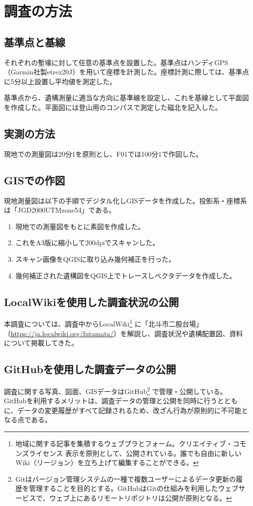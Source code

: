 \documentclass[14Q]{jsarticle}
\begin{document}
\section{調査の方法}
\subsection{基準点と基線}
それぞれの塹壕に対して任意の基準点を設置した。基準点はハンディGPS（Garmin社製etrex20J）を用いて座標を計測した。座標計測に際しては、基準点に5分以上設置し平均値を測定した。

基準点から、遺構測量に適当な方向に基準線を設定し、これを基線として平面図を作成した。平面図には登山用のコンパスで測定した磁北を記入した。

\subsection{実測の方法}
現地での測量図は20分1を原則とし、F01では100分1で作図した。

\subsection{GISでの作図}
現地測量図は以下の手順でデジタル化しGISデータを作成した。投影系・座標系は「JGD2000UTMzone54」である。
\begin{enumerate}
\item 現地での測量図をもとに素図を作成した。
\item これをA3版に縮小して200dpiでスキャンした。
\item スキャン画像をQGISに取り込み幾何補正を行った。
\item 幾何補正された遺構図をQGIS上でトレースしベクタデータを作成した。
\end{enumerate}

\subsection{LocalWikiを使用した調査状況の公開}
本調査については、調査中からLocalWiki\footnote{
地域に関する記事を集積するウェブプラとフォーム。クリエイティブ・コモンズライセンス 表示を原則として、公開されている。誰でも自由に新しいWiki（リージョン）を立ち上げて編集することができる。
}
に「北斗市二股台場」（\url{https://ja.localwiki.org/futamata/}）を解説し、調査状況や遺構配置図、資料について掲載してきた。

\subsection{GitHubを使用した調査データの公開}
調査に関する写真、図面、GISデータはGitHub\footnote{
Gitはバージョン管理システムの一種で複数ユーザーによるデータ更新の履歴を管理することを目的とする。GitHubはGitの仕組みを利用したウェブサービスで、ウェブ上にあるリモートリポジトリは公開が原則となる。
}
で管理・公開している。GitHubを利用するメリットは、調査データの管理と公開を同時に行うとともに、データの変更履歴がすべて記録されるため、改ざん行為が原則的に不可能となる点である。
\end{document}
